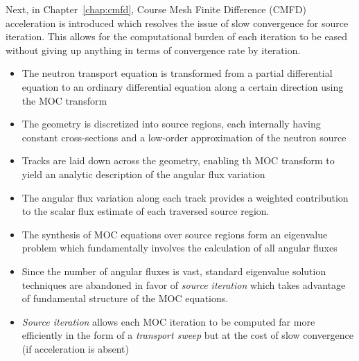 Next, in Chapter~\ref{chap:cmfd}, Course Mesh Finite Difference (CMFD) acceleration is introduced which resolves the issue of slow convergence for source iteration. This allows for the computational burden of each iteration to be eased without giving up anything in terms of convergence rate by iteration.

\vfill
\begin{highlightsbox}[frametitle=Highlights]
	\begin{itemize}
		\item The neutron transport equation is transformed from a partial differential equation to an ordinary differential equation along a certain direction using the \ac{MOC} transform
		\item The geometry is discretized into source regions, each internally having constant cross-sections and a low-order approximation of the neutron source
		\item Tracks are laid down across the geometry, enabling th  \ac{MOC} transform to yield an analytic description of the angular flux variation
		\item The angular flux variation along each track provides a weighted contribution to the scalar flux estimate of each traversed source region.
		\item The synthesis of \ac{MOC} equations over source regions form an eigenvalue problem which fundamentally involves the calculation of all angular fluxes
		\item Since the number of angular fluxes is vast, standard eigenvalue solution techniques are abandoned in favor of \textit{source iteration} which takes advantage of fundamental structure of the \ac{MOC} equations.
		\item \textit{Source iteration} allows each \ac{MOC} iteration to be computed far more efficiently in the form of a \textit{transport sweep} but at the cost of slow convergence (if acceleration is absent)
	\end{itemize}
\end{highlightsbox}





